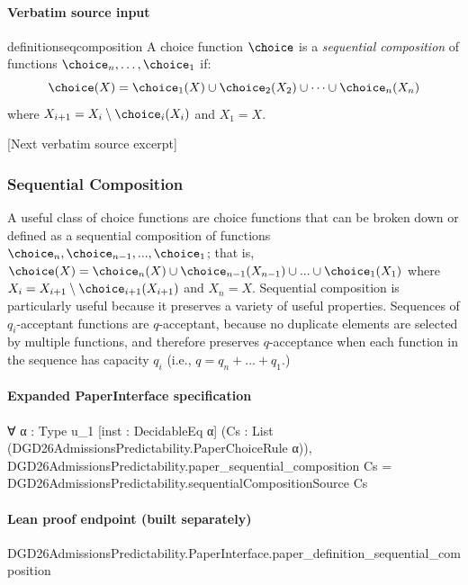 \documentclass[10pt]{article}
\begin{document}
\paragraph{Verbatim source input}
\begin{ReviewVerbatim}
\begin{restatable}{definition}{seqcomposition} \label{def:seq-composition}
A choice function $\choice$ is a \textit{sequential composition} of functions $\choice_n, \ldots, \choice_1$ if:
$$\choice(X) = \choice_1(X) \cup \choice_{2}(X_{2}) \cup \cdots \cup \choice_n(X_n)$$
where $X_{i+1}= X_{i} \setminus \choice_{i}(X_{i})$ and $X_1 = X$.
\end{restatable}

[Next verbatim source excerpt]

\subsubsection{Sequential Composition} \label{sec:seq-proofs}
A useful class of choice functions are choice functions that can be broken down or defined as a sequential composition of functions $\choice_n, \choice_{n-1}, ..., \choice_1$; that is,
$\choice(X) = \choice_n(X) \cup \choice_{n-1}(X_{n-1}) \cup ... \cup \choice_1(X_1)$ where $X_i = X_{i+1} \setminus\choice_{i+1}(X_{i+1})$ and $X_n = X$. Sequential composition is particularly useful because it preserves a variety of useful properties. Sequences of $q_i$-acceptant functions are $q$-acceptant, because no duplicate elements are selected by multiple functions, and therefore preserves $q$-acceptance when each function in the sequence has capacity $q_i$ (i.e., $q = q_n + ... + q_1$.)
\seqcomposition*
\end{ReviewVerbatim}


\paragraph{Expanded PaperInterface specification}
\begin{ReviewVerbatim}
∀ {α : Type u_1} [inst : DecidableEq α] (Cs : List (DGD26AdmissionsPredictability.PaperChoiceRule α)),
  DGD26AdmissionsPredictability.paper_sequential_composition Cs =
    DGD26AdmissionsPredictability.sequentialCompositionSource Cs
\end{ReviewVerbatim}

\paragraph{Lean proof endpoint (built separately)}\begin{ReviewVerbatim}
DGD26AdmissionsPredictability.PaperInterface.paper_definition_sequential_composition
\end{ReviewVerbatim}
\end{document}
